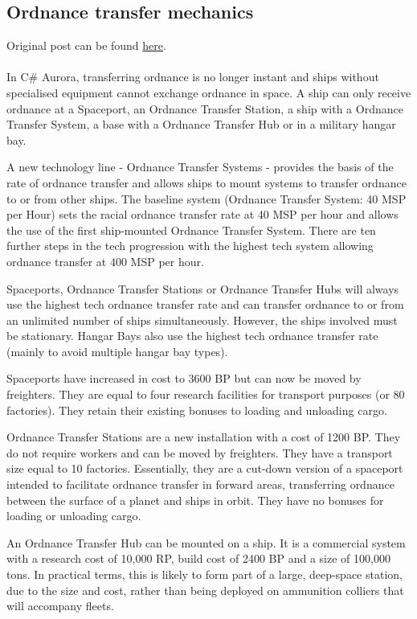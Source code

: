 \documentclass[../../Aurora C# unofficial manual.tex]{subfiles}
\begin{document}
	\subsection{Ordnance transfer mechanics}
	Original post can be found
	\href{http://aurora2.pentarch.org/index.php?topic=8495.msg104195#msg104195}{here}.
	\\\\
	
	In C\# Aurora, transferring ordnance is no longer instant and ships without specialised equipment cannot exchange ordnance in space. A ship can only receive ordnance at a Spaceport, an Ordnance Transfer Station, a ship with a Ordnance Transfer System, a base with a Ordnance Transfer Hub or in a military hangar bay.
	
	A new technology line - Ordnance Transfer Systems - provides the basis of the rate of ordnance transfer and allows ships to mount systems to transfer ordnance to or from other ships. The baseline system (Ordnance Transfer System: 40 MSP per Hour) sets the racial ordnance transfer rate at 40 MSP per hour and allows the use of the first ship-mounted Ordnance Transfer System. There are ten further steps in the tech progression with the highest tech system allowing ordnance transfer at 400 MSP per hour.
	
	Spaceports, Ordnance Transfer Stations or Ordnance Transfer Hubs will always use the highest tech ordnance transfer rate and can transfer ordnance to or from an unlimited number of ships simultaneously. However, the ships involved must be stationary. Hangar Bays also use the highest tech ordnance transfer rate (mainly to avoid multiple hangar bay types).
	
	Spaceports have increased in cost to 3600 BP but can now be moved by freighters. They are equal to four research facilities for transport purposes (or 80 factories). They retain their existing bonuses to loading and unloading cargo.
	
	Ordnance Transfer Stations are a new installation with a cost of 1200 BP. They do not require workers and can be moved by freighters. They have a transport size equal to 10 factories. Essentially, they are a cut-down version of a spaceport intended to facilitate ordnance transfer in forward areas, transferring ordnance between the surface of a planet and ships in orbit. They have no bonuses for loading or unloading cargo.
	
	An Ordnance Transfer Hub can be mounted on a ship. It is a commercial system with a research cost of 10,000 RP, build cost of 2400 BP and a size of 100,000 tons. In practical terms, this is likely to form part of a large, deep-space station, due to the size and cost, rather than being deployed on ammunition colliers that will accompany fleets.
	
\end{document}
